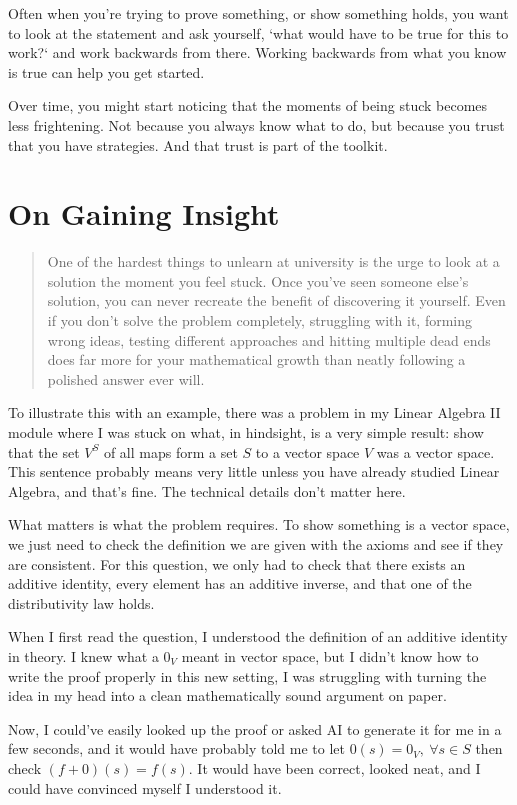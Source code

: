Often when you're trying to prove something, or show something holds, you want to look at the statement and ask yourself, `what would have to be true for this to work?` and work backwards from there. Working backwards from what you know is true can help you get started. 

Over time, you might start noticing that the moments of being stuck becomes less frightening. Not because you always know what to do, but because you trust that you have strategies. And that trust is part of the toolkit.  

\section{On Gaining Insight}
\begin{quote}
One of the hardest things to unlearn at university is the urge to look at a solution the moment you feel stuck. Once you've seen someone else's solution, you can never recreate the benefit of discovering it yourself. Even if you don't solve the problem completely, struggling with it, forming wrong ideas, testing different approaches and hitting multiple dead ends does far more for your mathematical growth than neatly following a polished answer ever will.
\end{quote}

To illustrate this with an example, there was a problem in my Linear Algebra II module where I was stuck on what, in hindsight, is a very simple result: show that the set $V^S$ of all maps form a set $S$ to a vector space $V$ was a vector space. This sentence probably means very little unless you have already studied Linear Algebra, and that's fine. The technical details don't matter here. 

What matters is what the problem requires. To show something is a vector space, we just need to check the definition we are given with the axioms and see if they are consistent. For this question, we only had to check that there exists an additive identity, every element has an additive inverse, and that one of the distributivity law holds.

When I first read the question, I understood the definition of an additive identity in theory. I knew what a $0_V$ meant in vector space, but I didn't know how to write the proof properly in this new setting, I was struggling with turning the idea in my head into a clean mathematically sound argument on paper. 

Now, I could've easily looked up the proof or asked AI to generate it for me in a few seconds, and it would have probably told me to let $0(s) = 0_V , \ \forall s \in S$ then check $(f+0)(s) = f(s)$. It would have been correct, looked neat, and I could have convinced myself I understood it. 

